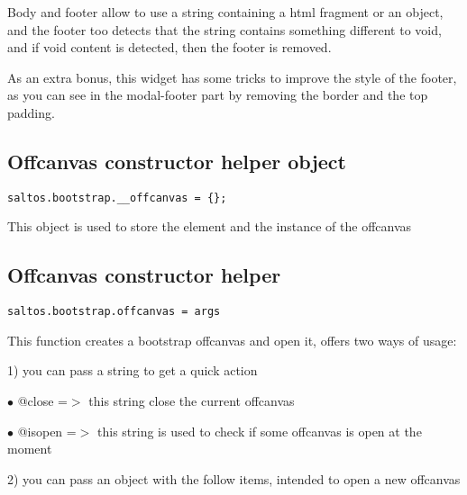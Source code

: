 \documentclass[a4paper]{book}
\begin{document}
Body and footer allow to use a string containing a html fragment or an object, and
the footer too detects that the string contains something different to void, and if
void content is detected, then the footer is removed.

As an extra bonus, this widget has some tricks to improve the style of the footer, as
you can see in the modal-footer part by removing the border and the top padding.

\hypertarget{toc502}{}
\subsection{Offcanvas constructor helper object}

\begin{lstlisting}
saltos.bootstrap.__offcanvas = {};
\end{lstlisting}

This object is used to store the element and the instance of the offcanvas

\hypertarget{toc503}{}
\subsection{Offcanvas constructor helper}

\begin{lstlisting}
saltos.bootstrap.offcanvas = args
\end{lstlisting}

This function creates a bootstrap offcanvas and open it, offers two ways of usage:

1) you can pass a string to get a quick action

\begin{compactitem}
\item[\color{myblue}$\bullet$] @close  =$>$ this string close the current offcanvas
\item[\color{myblue}$\bullet$] @isopen =$>$ this string is used to check if some offcanvas is open at the moment
\end{compactitem}

2) you can pass an object with the follow items, intended to open a new offcanvas
\end{document}

